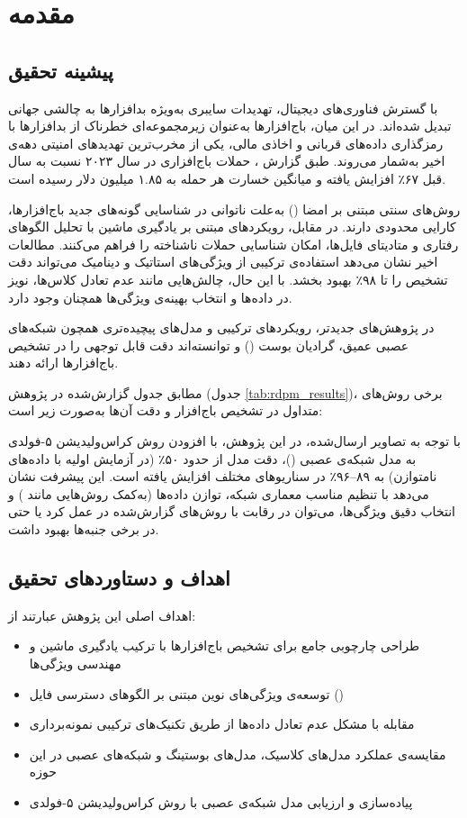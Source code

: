 \chapter{مقدمه}

\section{پیشینه تحقیق}
با گسترش فناوری‌های دیجیتال، تهدیدات سایبری به‌ویژه بدافزارها به چالشی جهانی تبدیل شده‌اند. در این میان، باج‌افزارها به‌عنوان زیرمجموعه‌ای خطرناک از بدافزارها با رمزگذاری داده‌های قربانی و اخاذی مالی، یکی از مخرب‌ترین تهدیدهای امنیتی دهه‌ی اخیر به‌شمار می‌روند. طبق گزارش \cite{cybertalk2023}، حملات باج‌افزاری در سال ۲۰۲۳ نسبت به سال قبل ۶۷٪ افزایش یافته و میانگین خسارت هر حمله به ۱.۸۵ میلیون دلار رسیده است.

روش‌های سنتی مبتنی بر امضا () به‌علت ناتوانی در شناسایی گونه‌های جدید باج‌افزارها، کارایی محدودی دارند. در مقابل، رویکردهای مبتنی بر یادگیری ماشین با تحلیل الگوهای رفتاری و متادیتای فایل‌ها، امکان شناسایی حملات ناشناخته را فراهم می‌کنند. مطالعات اخیر \cite{li2022} نشان می‌دهد استفاده‌ی ترکیبی از ویژگی‌های استاتیک و دینامیک می‌تواند دقت تشخیص را تا ۹۸٪ بهبود بخشد. با این حال، چالش‌هایی مانند عدم تعادل کلاس‌ها، نویز در داده‌ها و انتخاب بهینه‌ی ویژگی‌ها همچنان وجود دارد.

در پژوهش‌های جدیدتر، رویکردهای ترکیبی و مدل‌های پیچیده‌تری همچون شبکه‌های عصبی عمیق، گرادیان بوست () و  توانسته‌اند دقت قابل توجهی را در تشخیص باج‌افزارها ارائه دهند.

مطابق جدول گزارش‌شده در پژوهش  \cite{singh2022ransomwaredetectionusingprocess} (جدول \ref{tab:rdpm_results})، برخی روش‌های متداول در تشخیص باج‌افزار و دقت آن‌ها به‌صورت زیر است:


با توجه به تصاویر ارسال‌شده، در این پژوهش، با افزودن روش کراس‌ولیدیشن ۵-فولدی به مدل شبکه‌ی عصبی ()، دقت مدل از حدود ۵۰٪ (در آزمایش اولیه با داده‌های نامتوازن) به ۸۹--۹۶٪ در سناریوهای مختلف افزایش یافته است. این پیشرفت نشان می‌دهد با تنظیم مناسب معماری شبکه، توازن داده‌ها (به‌کمک روش‌هایی مانند ) و انتخاب دقیق ویژگی‌ها، می‌توان در رقابت با روش‌های گزارش‌شده در  عمل کرد یا حتی در برخی جنبه‌ها بهبود داشت.

\section{اهداف و دستاوردهای تحقیق}
اهداف اصلی این پژوهش عبارتند از:
\begin{itemize}
  \item طراحی چارچوبی جامع برای تشخیص باج‌افزارها با ترکیب یادگیری ماشین و مهندسی ویژگی‌ها
  \item توسعه‌ی ویژگی‌های نوین مبتنی بر الگوهای دسترسی فایل ()
  \item مقابله با مشکل عدم تعادل داده‌ها از طریق تکنیک‌های ترکیبی نمونه‌برداری
  \item مقایسه‌ی عملکرد مدل‌های کلاسیک، مدل‌های بوستینگ و شبکه‌های عصبی در این حوزه
  \item پیاده‌سازی و ارزیابی مدل شبکه‌ی عصبی با روش کراس‌ولیدیشن ۵-فولدی
\end{itemize}

